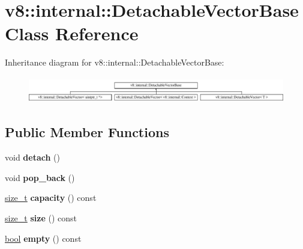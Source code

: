 \hypertarget{classv8_1_1internal_1_1DetachableVectorBase}{}\section{v8\+:\+:internal\+:\+:Detachable\+Vector\+Base Class Reference}
\label{classv8_1_1internal_1_1DetachableVectorBase}
Inheritance diagram for v8\+:\+:internal\+:\+:Detachable\+Vector\+Base\+:\begin{figure}[H]
\begin{center}
\leavevmode
\includegraphics[height=1.152263cm]{classv8_1_1internal_1_1DetachableVectorBase}
\end{center}
\end{figure}
\subsection*{Public Member Functions}
\begin{DoxyCompactItemize}
\item 
\mbox{\label{classv8_1_1internal_1_1DetachableVectorBase_add7c32a00419af468f38d5465e7db843}} 
void {\bfseries detach} ()
\item 
\mbox{\label{classv8_1_1internal_1_1DetachableVectorBase_a1dfa91b972015c1fe2f2e902494997cb}} 
void {\bfseries pop\+\_\+back} ()
\item 
\mbox{\label{classv8_1_1internal_1_1DetachableVectorBase_a5208c1878f4aa0fe374c3054c5dd1f33}} 
\mbox{\hyperlink{classsize__t}{size\+\_\+t}} {\bfseries capacity} () const
\item 
\mbox{\label{classv8_1_1internal_1_1DetachableVectorBase_a006f11c6b1faf03b31e4ac57edcd67e1}} 
\mbox{\hyperlink{classsize__t}{size\+\_\+t}} {\bfseries size} () const
\item 
\mbox{\label{classv8_1_1internal_1_1DetachableVectorBase_a3e8a7120606a5e1b6e175fbfebd70c84}} 
\mbox{\hyperlink{classbool}{bool}} {\bfseries empty} () const
\end{DoxyCompactItemize}
